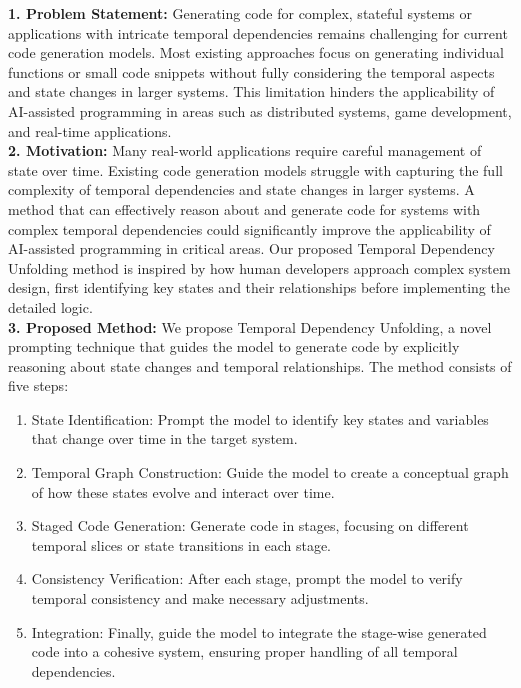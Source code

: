 \begin{tcolorbox}[colback=blue!5!white,colframe=blue!75!black,title=\textbf{Temporal Dependency Unfolding: Improving Code Generation for Complex Stateful Systems (Part 1)}]
\small{
\textbf{1. Problem Statement:} Generating code for complex, stateful systems or applications with intricate temporal dependencies remains challenging for current code generation models. Most existing approaches focus on generating individual functions or small code snippets without fully considering the temporal aspects and state changes in larger systems. This limitation hinders the applicability of AI-assisted programming in areas such as distributed systems, game development, and real-time applications.
\\

\textbf{2. Motivation:} Many real-world applications require careful management of state over time. Existing code generation models struggle with capturing the full complexity of temporal dependencies and state changes in larger systems. A method that can effectively reason about and generate code for systems with complex temporal dependencies could significantly improve the applicability of AI-assisted programming in critical areas. Our proposed Temporal Dependency Unfolding method is inspired by how human developers approach complex system design, first identifying key states and their relationships before implementing the detailed logic.
\\

\textbf{3. Proposed Method:} We propose Temporal Dependency Unfolding, a novel prompting technique that guides the model to generate code by explicitly reasoning about state changes and temporal relationships. The method consists of five steps:
\begin{enumerate}
    \item State Identification: Prompt the model to identify key states and variables that change over time in the target system.
    \item Temporal Graph Construction: Guide the model to create a conceptual graph of how these states evolve and interact over time.
    \item Staged Code Generation: Generate code in stages, focusing on different temporal slices or state transitions in each stage.
    \item Consistency Verification: After each stage, prompt the model to verify temporal consistency and make necessary adjustments.
    \item Integration: Finally, guide the model to integrate the stage-wise generated code into a cohesive system, ensuring proper handling of all temporal dependencies.
\end{enumerate}

}
\end{tcolorbox}
